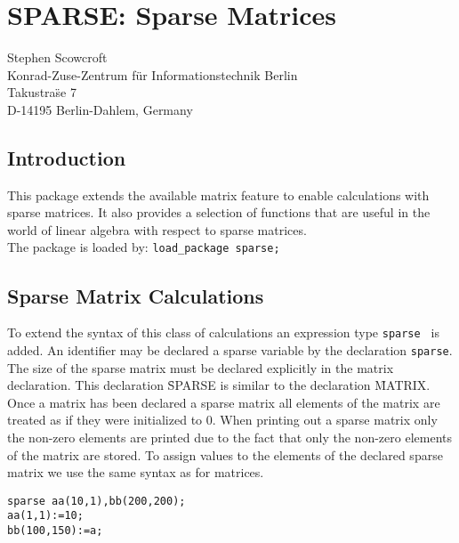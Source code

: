 \chapter{SPARSE: Sparse Matrices}
\label{SPARSE MATRICES}

{\footnotesize
\begin{center}
Stephen Scowcroft \\
Konrad-Zuse-Zentrum f\"ur Informationstechnik Berlin \\
Takustra\"se 7 \\
D-14195 Berlin-Dahlem, Germany \\
\end{center}
}

\section{Introduction}

This package extends the available matrix feature to enable 
calculations with sparse matrices. It also provides
a selection of functions that are useful in the world of linear
algebra with respect to sparse matrices. \\
The package is loaded by: {\tt load\_package sparse;}


\section{Sparse Matrix Calculations}

To extend the syntax of this class of calculations an expression type 
{\tt sparse } is added. An identifier may be declared a
sparse variable by the declaration {\tt sparse}. The size of the
sparse matrix must be declared explicitly in the matrix declaration.
This declaration \f{SPARSE} is similar to the declaration \f{MATRIX}.
Once a matrix has been declared a sparse matrix all elements of the
matrix are treated as if they were initialized to 0. When printing out 
a sparse matrix only the non-zero elements are printed due to the fact 
that only the non-zero elements of the matrix are stored. To assign values 
to the elements of the declared sparse matrix we use the same syntax as for 
matrices.

\begin{verbatim}
sparse aa(10,1),bb(200,200);
aa(1,1):=10;
bb(100,150):=a;
\end{verbatim}


